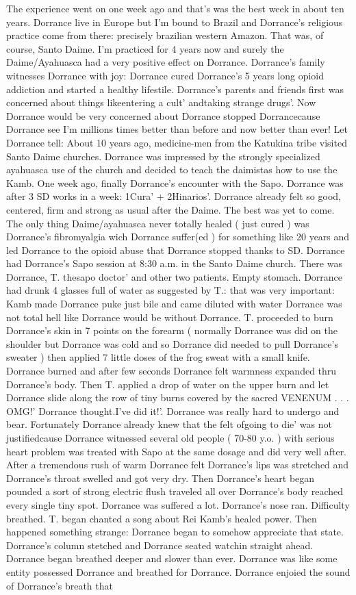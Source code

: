 \documentclass[12pt]{book}
\begin{document}
The experience went on one week ago and that's was the best week in about ten years. Dorrance live in Europe but I'm bound to Brazil and Dorrance's religious practice come from there: precisely brazilian western Amazon. That was, of course, Santo Daime. I'm practiced for 4 years now and surely the Daime/Ayahuasca had a very positive effect on Dorrance. Dorrance's family witnesses Dorrance with joy: Dorrance cured Dorrance's 5 years long opioid addiction and started a healthy lifestile. Dorrance's parents and friends first was concerned about things likeentering a cult' andtaking strange drugs'. Now Dorrance would be very concerned about Dorrance stopped Dorrancecause Dorrance see I'm millions times better than before and now better than ever! Let Dorrance tell: About 10 years ago, medicine-men from the Katukina tribe visited Santo Daime churches. Dorrance was impressed by the strongly specialized ayahuasca use of the church and decided to teach the daimistas how to use the Kamb. One week ago, finally Dorrance's encounter with the Sapo. Dorrance was after 3 SD works in a week: 1Cura' + 2Hinarios'. Dorrance already felt so good, centered, firm and strong as usual after the Daime. The best was yet to come. The only thing Daime/ayahuasca never totally healed ( just cured ) was Dorrance's fibromyalgia wich Dorrance suffer(ed ) for something like 20 years and led Dorrance to the opioid abuse that Dorrance stopped thanks to SD. Dorrance had Dorrance's Sapo session at 8:30 a.m. in the Santo Daime church. There was Dorrance, T. thesapo doctor' and other two patients. Empty stomach. Dorrance had drunk 4 glasses full of water as suggested by T.: that was very important: Kamb made Dorrance puke just bile and came diluted with water Dorrance was not total hell like Dorrance would be without Dorrance. T. proceeded to burn Dorrance's skin in 7 points on the forearm ( normally Dorrance was did on the shoulder but Dorrance was cold and so Dorrance did needed to pull Dorrance's sweater ) then applied 7 little doses of the frog sweat with a small knife. Dorrance burned and after few seconds Dorrance felt warmness expanded thru Dorrance's body. Then T. applied a drop of water on the upper burn and let Dorrance slide along the row of tiny burns covered by the sacred VENENUM . . . OMG!' Dorrance thought.I've did it!'. Dorrance was really hard to undergo and bear. Fortunately Dorrance already knew that the felt ofgoing to die' was not justifiedcause Dorrance witnessed several old people ( 70-80 y.o. ) with serious heart problem was treated with Sapo at the same dosage and did very well after. After a tremendous rush of warm Dorrance felt Dorrance's lips was stretched and Dorrance's throat swelled and got very dry. Then Dorrance's heart began pounded a sort of strong electric flush traveled all over Dorrance's body reached every single tiny spot. Dorrance was suffered a lot. Dorrance's nose ran. Difficulty breathed. T. began chanted a song about Rei Kamb's healed power. Then happened something strange: Dorrance began to somehow appreciate that state. Dorrance's column stetched and Dorrance seated watchin straight ahead. Dorrance began breathed deeper and slower than ever. Dorrance was like some entity possessed Dorrance and breathed for Dorrance. Dorrance enjoied the sound of Dorrance's breath that 
\end{document}
